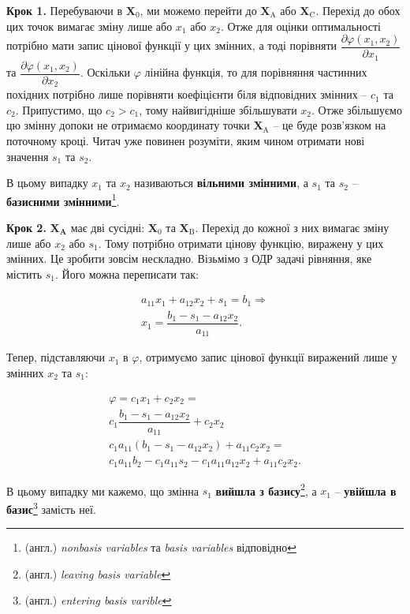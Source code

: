 \documentclass[\main/book.tex]{subfiles}
\begin{document}
\textbf{Крок 1.} \quad Перебуваючи в $\mathbf{X}_0$, ми можемо перейти до $\mathbf{X}_\mathrm{A}$ або $\mathbf{X}_\mathrm{C}$. Перехід до обох цих точок вимагає зміну лише або $x_1$ або $x_2$. Отже для оцінки оптимальності потрібно мати запис цінової функції у цих змінних, а тоді порівняти $\dfrac{\partial \varphi(x_1, x_2)}{\partial x_1}$ та $\dfrac{\partial \varphi(x_1, x_2)}{\partial x_2}$. Оскільки $\varphi$ лінійна функція, то для порівняння частинних похідних потрібно лише порівняти коефіцієнти біля відповідних змінних -- $c_1$ та $c_2$. Припустимо, що $c_2 > c_1$, тому найвигідніше збільшувати $x_2$. Отже збільшуємо цю змінну допоки не отримаємо координату точки $\mathbf{X}_\mathrm{A}$ -- це буде розв'язком на поточному кроці. Читач уже повинен розуміти, яким чином отримати нові значення $s_1$ та $s_2$.

В цьому випадку $x_1$ та $x_2$ називаються \textbf{вільними змінними}, а $s_1$ та $s_2$ -- \textbf{базисними змінними}\footnote{(англ.) \textit{nonbasis variables} та \textit{basis variables} відповідно}.

\textbf{Крок 2.}  $\mathbf{X}_\mathbf{A}$ має дві сусідні: $\mathbf{X}_0$ та $\mathbf{X}_\mathrm{B}$. Перехід до кожної з них вимагає зміну лише або $x_2$ або $s_1$. Тому потрібно отримати цінову функцію, виражену у цих змінних. Це зробити зовсім нескладно. Візьмімо з ОДР задачі рівняння, яке містить $s_1$. Його можна переписати так:
 
 \[
 \begin{split}
  a_{11} x_1 + a_{12} x_2 + s_1 = b_1 \Rightarrow \\
  x_1 = \dfrac{b_1 - s_1 - a_{12} x_2}{a_{11}}.
 \end{split}
 \]
 
Тепер, підставляючи $x_1$ в $\varphi$, отримуємо запис цінової функції виражений лише у змінних $x_2$ та $s_1$:
 
\[
  \begin{split}
   \varphi = c_1 x_1 + c_2 x_2 = \\
   c_1 \dfrac{b_1 - s_1 - a_{12} x_2}{a_{11}} + c_2 x_2 \\
   c_1 a_{11} (b_1 - s_1 - a_{12} x_2) + a_{11} c_2 x_2 = \\
   c_1 a_{11} b_2 - c_1 a_{11} s_2 - c_1 a_{11} a_{12} x_2 + a_{11} c_2 x_2.
  \end{split}
\]

В цьому випадку ми кажемо, що змінна $s_1$ \textbf{вийшла з базису}\footnote{(англ.) \textit{leaving basis variable}}, а $x_1$ -- \textbf{увійшла в базис}\footnote{(англ.) \textit{entering basis varible}} замість неї.
\end{document}
